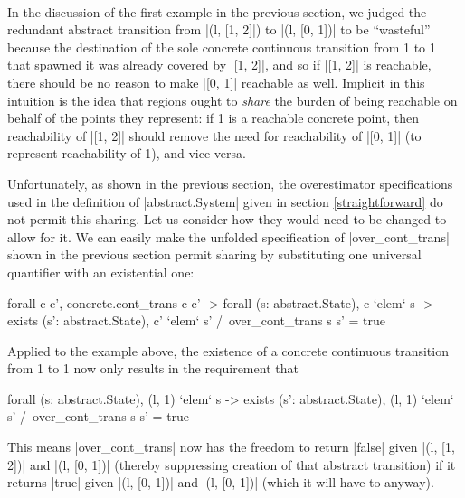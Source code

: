 \documentclass[runningheads]{llncs}
\begin{document}

\

\noindent In the discussion of the first example in the previous section, we judged the redundant abstract transition from |(l, [1, 2]|) to |(l, [0, 1])| to be ``wasteful'' because the destination of the sole concrete continuous transition from 1 to 1 that spawned it was already covered by |[1, 2]|, and so if |[1, 2]| is reachable, there should be no reason to make |[0, 1]| reachable as well. Implicit in this intuition is the idea that regions ought to \emph{share} the burden of being reachable on behalf of the points they represent: if 1 is a reachable concrete point, then reachability of |[1, 2]| should remove the need for reachability of |[0, 1]| (to represent reachability of 1), and vice versa.

Unfortunately, as shown in the previous section, the overestimator specifications used in the definition of |abstract.System| given in section \ref{straightforward} do not permit this sharing. Let us consider how they would need to be changed to allow for it. We can easily make the unfolded specification of |over_cont_trans| shown in the previous section permit sharing by substituting one universal quantifier with an existential one:
\begin{code}
  forall c c', concrete.cont_trans c c' ->
  forall (s: abstract.State), c `elem` s ->
  exists (s': abstract.State), c' `elem` s' /\
    over_cont_trans s s' = true
\end{code}
Applied to the example above, the existence of a concrete continuous transition from 1 to 1 now only results in the requirement that
\begin{code}
  forall (s: abstract.State), (l, 1) `elem` s ->
  exists (s': abstract.State), (l, 1) `elem` s' /\
    over_cont_trans s s' = true
\end{code}
This means |over_cont_trans| now has the freedom to return |false| given |(l, [1, 2])| and |(l, [0, 1])| (thereby suppressing creation of that abstract transition) if it returns |true| given |(l, [0, 1])| and |(l, [0, 1])| (which it will have to anyway).
\end{document}
